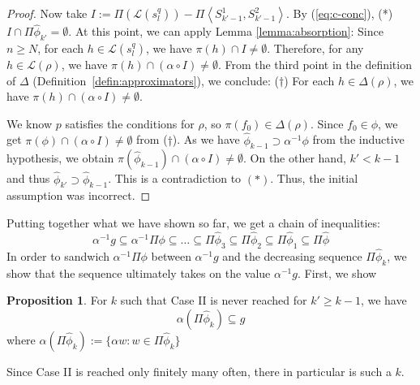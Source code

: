 \documentclass[sigplan,9pt]{acmart}\settopmatter{printfolios=true,printccs=false,printacmref=false}
\newcounter{thm}
\newcounter{theorem}
\theoremstyle{definition}
\newtheorem{prop}[thm]{Proposition}
\newcommand{\La}[0]{{\mathcal{L}}}
\begin{document}
\begin{proof}
Now take $I := \Pi(\La(s_l^q)) - \Pi\left\langle S^1_{{k'}-1}, S^2_{{k'}-1}\right\rangle $.
By (\ref{eq:c-conc}), (*) $I \cap \Pi \widehat{\phi}_{{k'}} = \emptyset$.
At this point, we can apply Lemma \ref{lemma:absorption}:
Since $n \geq N$, for each $h \in \La(s_l^q)$, we have $\pi(h) \cap I \neq \emptyset$.
Therefore, for any $h \in \La(\rho)$, we have $\pi(h) \cap (\alpha \circ I) \neq \emptyset$.
From the third point in the definition of $\Delta$ (Definition~\ref{defin:approximators}), we conclude: ($\dagger$) For each $h \in \Delta(\rho)$, we have $\pi(h) \cap (\alpha \circ I) \neq \emptyset$.

We know $p$ satisfies the conditions for $\rho$, so $\pi(f_0) \in \Delta(\rho)$.
Since $f_0 \in \phi$, we get $\pi(\phi) \cap (\alpha \circ I) \neq \emptyset$ from ($\dagger$).
As we have $\widehat{\phi}_{k-1} \supset \alpha^{-1} \phi$ from the inductive hypothesis, we obtain $\pi(\widehat{\phi}_{k-1}) \cap (\alpha \circ I) \neq \emptyset$.
On the other hand, $k' < k-1$ and thus $\widehat{\phi}_{k'} \supset \widehat{\phi}_{k-1}$.
This is a contradiction to $(*)$. Thus, the initial assumption was incorrect.
\end{proof}
Putting together what we have shown so far, we get a chain of inequalities:
\begin{equation}
\alpha^{-1} g \subseteq \alpha^{-1} \Pi \phi \subseteq \dots \subseteq \Pi\widehat{\phi}_{3} \subseteq \Pi\widehat{\phi}_{2} \subseteq \Pi\widehat{\phi}_{1} \subseteq \Pi\widehat{\phi}
\end{equation}
In order to sandwich $\alpha^{-1} \Pi \phi$ between $\alpha^{-1} g$ and the decreasing sequence $\Pi\widehat{\phi}_{k}$, we show that the sequence ultimately takes on the value $\alpha^{-1} g$.
First, we show

\begin{prop}\label{obs:large-k}
For $k$ such that Case II is never reached for $k' \geq k-1$, we have 
\begin{equation}
 \label{b:fk-g} 
\alpha (\Pi \widehat{\phi}_{k}) \subseteq g
\end{equation}
where $\alpha (\Pi \widehat{\phi}_k) := \{\alpha w : w \in \Pi\widehat{\phi}_k\}$

Since Case II is reached only finitely many often, there in particular is such a $k$.

\end{prop}
\end{document}
